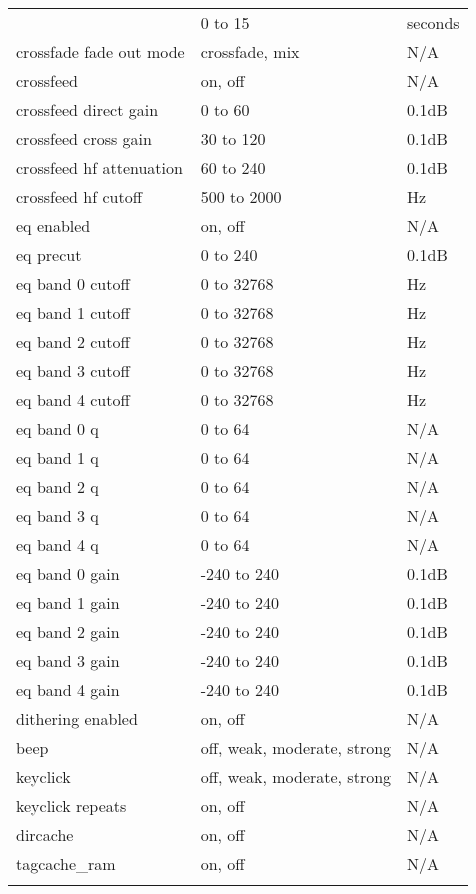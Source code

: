 \begin{center}
\begin{longtable}{@{}>{\raggedright}p{}@{}>{\raggedright}p{}@{}p{}@{}}
{      crossfade fade out duration
                    & 0 to 15           & seconds\\
      crossfade fade out mode
                    & crossfade, mix    & N/A\\
%
      crossfeed     & on, off           & N/A\\
      crossfeed direct gain
                    & 0 to 60           & 0.1dB\\
      crossfeed cross gain
                    & 30 to 120         & 0.1dB\\
      crossfeed hf attenuation
                    & 60 to 240         & 0.1dB\\
      crossfeed hf cutoff
                    & 500 to 2000       & Hz\\
%
      eq enabled    & on, off           & N/A\\
      eq precut     & 0 to 240          & 0.1dB\\
      eq band 0 cutoff & 0 to 32768     & Hz\\
      eq band 1 cutoff & 0 to 32768     & Hz\\
      eq band 2 cutoff & 0 to 32768     & Hz\\
      eq band 3 cutoff & 0 to 32768     & Hz\\
      eq band 4 cutoff & 0 to 32768     & Hz\\
      eq band 0 q   & 0 to 64           & N/A\\
      eq band 1 q   & 0 to 64           & N/A\\
      eq band 2 q   & 0 to 64           & N/A\\
      eq band 3 q   & 0 to 64           & N/A\\
      eq band 4 q   & 0 to 64           & N/A\\
      eq band 0 gain & -240 to 240      & 0.1dB\\
      eq band 1 gain & -240 to 240      & 0.1dB\\
      eq band 2 gain & -240 to 240      & 0.1dB\\
      eq band 3 gain & -240 to 240      & 0.1dB\\
      eq band 4 gain & -240 to 240      & 0.1dB\\
%
      dithering enabled & on, off       & N/A\\
      beep          & off, weak, moderate, strong & N/A\\
      keyclick      & off, weak, moderate, strong & N/A\\
      keyclick repeats & on, off        & N/A\\
      dircache      & on, off           & N/A\\
      tagcache\_ram & on, off           & N/A\\
    }%


\end{longtable}
\end{center}
